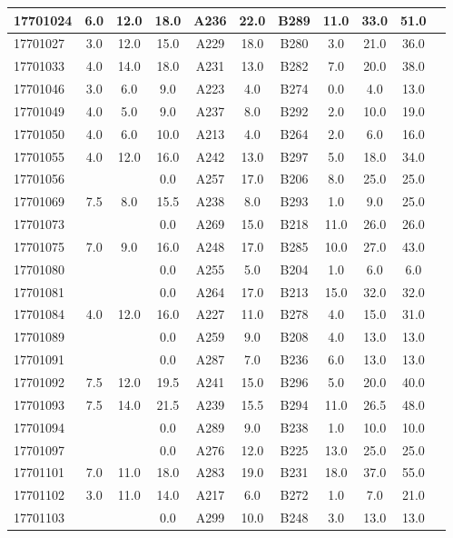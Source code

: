 \documentclass[12pt]{article}
\begin{document}
\begin{center}
\begin{small}
\begin{tabular}{|l|c|c|c|c|c|c|c|c|c|c|}
17701024 & 6.0 & 12.0 & 18.0 & A236 & 22.0 & B289 & 11.0 & 33.0 & 51.0\\ \hline 
17701027 & 3.0 & 12.0 & 15.0 & A229 & 18.0 & B280 & 3.0 & 21.0 & 36.0\\ \hline 
17701033 & 4.0 & 14.0 & 18.0 & A231 & 13.0 & B282 & 7.0 & 20.0 & 38.0\\ \hline 
17701046 & 3.0 & 6.0 & 9.0 & A223 & 4.0 & B274 & 0.0 & 4.0 & 13.0\\ \hline 
17701049 & 4.0 & 5.0 & 9.0 & A237 & 8.0 & B292 & 2.0 & 10.0 & 19.0\\ \hline 
17701050 & 4.0 & 6.0 & 10.0 & A213 & 4.0 & B264 & 2.0 & 6.0 & 16.0\\ \hline 
17701055 & 4.0 & 12.0 & 16.0 & A242 & 13.0 & B297 & 5.0 & 18.0 & 34.0\\ \hline 
17701056 &  &  & 0.0 & A257 & 17.0 & B206 & 8.0 & 25.0 & 25.0\\ \hline 
17701069 & 7.5 & 8.0 & 15.5 & A238 & 8.0 & B293 & 1.0 & 9.0 & 25.0\\ \hline 
17701073 &  &  & 0.0 & A269 & 15.0 & B218 & 11.0 & 26.0 & 26.0\\ \hline 
17701075 & 7.0 & 9.0 & 16.0 & A248 & 17.0 & B285 & 10.0 & 27.0 & 43.0\\ \hline 
17701080 &  &  & 0.0 & A255 & 5.0 & B204 & 1.0 & 6.0 & 6.0\\ \hline 
17701081 &  &  & 0.0 & A264 & 17.0 & B213 & 15.0 & 32.0 & 32.0\\ \hline 
17701084 & 4.0 & 12.0 & 16.0 & A227 & 11.0 & B278 & 4.0 & 15.0 & 31.0\\ \hline 
17701089 &  &  & 0.0 & A259 & 9.0 & B208 & 4.0 & 13.0 & 13.0\\ \hline 
17701091 &  &  & 0.0 & A287 & 7.0 & B236 & 6.0 & 13.0 & 13.0\\ \hline 
17701092 & 7.5 & 12.0 & 19.5 & A241 & 15.0 & B296 & 5.0 & 20.0 & 40.0\\ \hline 
17701093 & 7.5 & 14.0 & 21.5 & A239 & 15.5 & B294 & 11.0 & 26.5 & 48.0\\ \hline 
17701094 &  &  & 0.0 & A289 & 9.0 & B238 & 1.0 & 10.0 & 10.0\\ \hline 
17701097 &  &  & 0.0 & A276 & 12.0 & B225 & 13.0 & 25.0 & 25.0\\ \hline 
17701101 & 7.0 & 11.0 & 18.0 & A283 & 19.0 & B231 & 18.0 & 37.0 & 55.0\\ \hline 
17701102 & 3.0 & 11.0 & 14.0 & A217 & 6.0 & B272 & 1.0 & 7.0 & 21.0\\ \hline 
17701103 &  &  & 0.0 & A299 & 10.0 & B248 & 3.0 & 13.0 & 13.0\\ \hline 
        \end{tabular}
            \end{small}
            \end{center}
  \centering
            
\end{document}
